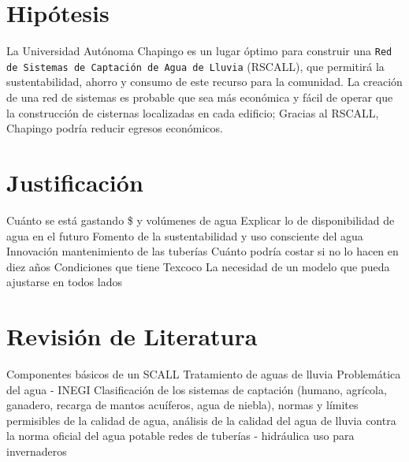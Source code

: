\chapter{Hipótesis}
La Universidad Autónoma Chapingo es un lugar óptimo para construir una \texttt{Red de Sistemas de Captación de Agua de Lluvia} (RSCALL), que permitirá la sustentabilidad, ahorro y consumo de este recurso para la comunidad.
La creación de una red de sistemas es probable que sea más económica y fácil de operar que la construcción de cisternas localizadas en cada edificio;
Gracias al RSCALL, Chapingo podría reducir egresos económicos.

\chapter{Justificación}
Cuánto se está gastando \$ y volúmenes de agua
Explicar lo de disponibilidad de agua en el futuro
Fomento de la sustentabilidad y uso consciente del agua
Innovación 
mantenimiento de las tuberías 
Cuánto podría costar si no lo hacen en diez años
Condiciones que tiene Texcoco
La necesidad de un modelo que pueda ajustarse en todos lados
\chapter{Revisión de Literatura}
Componentes básicos de un SCALL
Tratamiento de aguas de lluvia
Problemática del agua - INEGI
Clasificación de los sistemas de captación (humano, agrícola, ganadero, recarga de mantos acuíferos, agua de niebla),
normas y límites permisibles de la calidad de agua, análisis de la calidad del agua de lluvia contra la norma oficial del agua potable
redes de tuberías - hidráulica
uso para invernaderos








